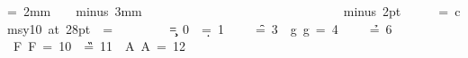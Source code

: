 \newdimen\unit \unit=2mm
\newskip\pskip \pskip=3mm minus 3mm
\newdimen\rem
\newdimen\ww
\newdimen\minw \minw=5mm
\newcount\min {}
\newcount\max {}
\newcount\hh
\newbox\textbox
\newif\iflead

\newdimen\normalspace \normalspace=3.33pt
\newdimen\xdiff
\newdimen\prevxdiff
\newdimen\skiplen
\newskip\leadskip

\parindent=0pt
\parskip=10pt minus 2pt
\footline{\hfil}
\font\largesym=cmsy10 at 28pt
=\largesym

\def\lead{\leaders\vrule height 2.25pt depth -2pt}

\def\\{\hfill\break}

\long\def\nota#1#2#3{%
  \leavevmode
  \setbox\textbox=\hbox{#2\hskip0pt}%
  \ww=\wd\textbox
  \ifdim \ww<\minw \ww=\minw \fi
  \prevxdiff=\xdiff
  \xdiff=\wd\textbox
  \advance\xdiff by -\minw
  \divide\xdiff by 2
  \skiplen=0pt
  \ifdim \prevxdiff<0pt
    \ifdim \xdiff>0pt
      \ifdim \xdiff<-\prevxdiff \skiplen=\xdiff \else \skiplen=-\prevxdiff \fi
    \fi
  \else
    \ifdim \xdiff<0pt
      \ifdim \prevxdiff<-\xdiff \skiplen=\prevxdiff \else \skiplen=-\xdiff \fi
    \fi
  \fi
  \hskip -\skiplen
  \ifdim\prevxdiff<0pt \leadskip=-\prevxdiff \else \leadskip=0pt \fi
  \ifdim\xdiff<0pt \advance\leadskip by -\xdiff \fi
  \advance\leadskip by -\skiplen
  \ifdim\leadskip<1pt \leadskip=0pt \fi
  \vbox{%
    \hh=-#1%
    \advance\hh by \max
    \vskip\hh\unit
    \hbox to \ww{%
      \hfil
      \pdfliteral{q \barva{#1} rg}%
      \hbox to 0pt{\hss$\bullet$\hss}%
      \pdfliteral{Q}%
      \hbox to 0pt{\hss$\circ$\hss}%
      \hfil
    }%
    \hh=#1%
    \advance\hh by -\min
    \vskip \hh\unit
    \hbox to \ww{%
      \hfil
      \iflead\hbox to 0pt{\hskip-\leadskip \lead\hfil}\fi
      #2#3%
      \hfil
    }%
  }%
  \relax
}

\def\p{\hskip\pskip\nobreak\ignorespaces}
\def\pp{%
  \leadskip=\pskip
  \ifdim\xdiff<0pt \hskip\xdiff \fi
  \advance\leadskip by -\xdiff
  \xdiff=0pt
  \lead\hskip\leadskip\nobreak\ignorespaces}

\newcount\c \c=0
\newcount\d \d=1
\newcount\e {}
\newcount\f \f=3
\newcount\g \g=4
\newcount\a {}
\newcount\h \h=6
\newcount\C {}
\newcount\D {}
\newcount\E {}
\newcount\F \F=10
\newcount\G \G=11
\newcount\A \A=12

\def\toix#1{\csname#1\endcsname}

\def\barva#1{\ifcase#1%
  1 0 0\or
  0 1 0\or
  1 1 0\or
  0.6 0.4 0\or
  0.2 0.2 1\or
  0.7 0 0.7\or
  1 1 1\or
  1 0 0\or
  0 1 0\or
  1 1 0\or
  0.6 0.4 0\or
  0.2 0.2 1\or
  0.7 0 0.7\fi}

